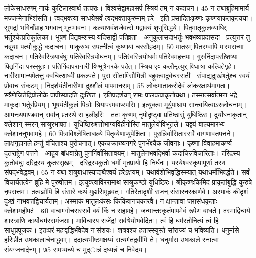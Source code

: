 लोकेसाधरणम् नार्यः कुटिलास्वार्थ तत्पराः।
 विश्वसेद्वामहासर्प स्त्रियं तम् न कदाचन।
 45 न तथाब्रूहिमामार्य मज्जन्मेनाभिशंसति।
 त्वद्भक्त्या साधयेसर्वं त्वद्भक्ताकुरुमाम् हरे।
 इति प्रसादितःकृष्णः कृष्णयाकृतकृत्यया।
 सुभद्रां भगिनींप्राह भगवान् भूतभावनः।
 कल्याणवंशजेवत्से मद्वाक्यं शृणुसिद्धये।
 पितृमातृकुलव्याधिर् भर्तुश्चेत्प्रतिकूलिका।
 भूषणं पितृवम्शस्य यदिसाद्वी पतिव्रता।
 अनुकूलासदाभर्तुः भवभव्यप्रदासदा।
 प्रत्युत्तरं तु नब्रूयाः पत्यौःकुद्धे कदाचन।
 माकुरुष्व सपत्नीत्वं कृष्णायां चरसौहृदम्।
 50 मातरम् पितरम्वापि मास्मरान्मा कदाचन।
 पतिरेवस्त्रियाबंधुः पतिरेवस्त्रियोधनम्।
 पतिरेवस्त्रियोधर्मः पतिरेवमहत्तपः।
 गुरुनिंदापरश्शिष्यः पितृनिंदा परस्सुतः।
 पतिनिंदापरानारी विण्मूत्रेनरके पतेत्।
 स्त्रिय एव कलौमृत्युर् विधात्रा कल्पितेगृहे।
 नारीसामान्यमेतत्तु क्वचित्साध्वी प्रकल्पते।
 पुरा सीतापिसौमित्री बहूक्त्वादुर्वचस्सती।
 संपाद्यदुःखंभर्तुश्च स्वयं प्रोवाच संकटम्।
 निदर्शयंतीनारीणां दुश्शीलं पापमानसम्।
 55
लोकमाताकरोदेवं लोकरक्षार्थमागता।
 स्त्रैणेजितेंद्रियोलोके पापीस्यादति दुःखितः।
 इतिप्रदर्शयन् रामः प्रालपत्प्राकृतोयथा।
 तस्मात्सर्वात्मना भद्रे माकृदा भर्तुरप्रियम्।
 भूषयंतीकुलं पित्रोः श्रियःपरमवाप्स्यसि।
 इत्युक्त्वा मूर्युपाघ्राय सान्त्वयित्वाऽरुलोचनाम्।
 आमन्त्र्यपाण्डवान् सर्वान् प्रतस्थे स हलीहरिः।
 ततः कृष्णम् नृपोदृष्ट्वा प्रतिष्ठासुं युधिष्ठिरः।
 दुर्योधनःकृतान् क्लेशान् स्मरन् साश्रुरभाषत।
 युधिष्ठिरःमत्तोभाग्यविहीनोस्ति मातुलेयोविभूतले।
 यद्वयं बाल्यमारभ्य क्लेशाननुभवामहे।
 60 पित्राविश्लेषिताबाल्ये पितृव्येणाप्युपेक्षिताः।
 पुरान्निर्वासितास्सर्वे वागणावतपत्तने।
 लाक्षगृहानले हन्तुं वंचिताश्च पुरोचनात्।
 एकचक्राख्यनगरे पुनर्भेक्ष्यैक जीवनाः।
 कृष्णा विवाहमाकर्ण्य दृतराष्ट्रेण पत्तने।
 आहूय बांधवाग्रेतु पुनर्निर्वासितावयम्।
 मातुलेनभवद्भिर्वा कदाचिन्नविचारिताः।
 दरिद्रस्य कुतोबंधुः दरिद्रस्य कुतस्सुखम्।
 दरिद्रस्यकुतो धर्मो मृतप्रायो हि निर्धनः।
 यस्येश्वरःकृपापूर्णा तस्य संपद्भवेद्धवम्।
 65
न यथा शत्रुबाधास्याद्यथैश्वर्यं हरेऽक्षयम्।
 यथावंशोभिवृद्धिस्स्यात् यथाधर्मोभिवर्द्धते।
 सर्वं विचार्यतत्वेन ब्रूहि मे पुरुषोत्तम।
 इत्युक्त्वाविररामाथ साश्रुकण्ठो युधिष्ठिरः।
 श्रीकृष्णःकिमिदं प्राकृतांबुद्धिं कुरुषे नृपसत्तम।
 तत्वज्ञोपि हि संसारे कथं मुह्यसिमूढवत्।
 गतिरेतादृशी राजन् संसारनरकार्णवे।
 अस्माकं कीदृशं दुःखं नाभवत्तद्विचार्यताम्।
 अस्माकं मातुलःकंसः किंकिंवानचकारवै।
 न क्षान्तावा जरासंधकृताः क्लेशामहीपते।
 ७0 वाचामगोचरास्सर्वे वयं किं न सहामहे।
 जन्मान्तरकृतंपापमेवं रूपेण बाधते।
 तस्माद्विचार्य शास्त्राणि कार्योधर्मस्समंजसः।
 माविचारय राजेंद्र! सर्वश्रेयोभवेदितः।
 त्वं हि धर्मरतोनित्यं त्वं हि साधुप्रपूजकः।
 इतःपरं महावृद्धिर्भवेदेव न संशयः।
 शत्रवश्च हतास्स्युस्ते सांराज्यं च भविष्यति।
 धनुर्मासे हरिःप्रीत उषःकालार्चनाद्ध्वम्।
 ददात्यभीष्टमक्षय्यं सत्यमेतद्रवीमि ते।
 धनुर्मास उषःकाले स्नात्वा संयग्जनार्दनम्।
 ७5 समभ्यर्च्य च मुद्ान्नं दध्यन्नं च निवेदय।

